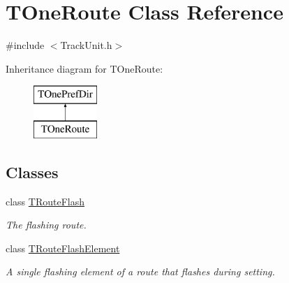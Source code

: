 \hypertarget{class_t_one_route}{}\section{T\+One\+Route Class Reference}
\label{class_t_one_route}


{\ttfamily \#include $<$Track\+Unit.\+h$>$}

Inheritance diagram for T\+One\+Route\+:\begin{figure}[H]
\begin{center}
\leavevmode
\includegraphics[height=2.000000cm]{class_t_one_route}
\end{center}
\end{figure}
\subsection*{Classes}
\begin{DoxyCompactItemize}
\item 
class \mbox{\hyperlink{class_t_one_route_1_1_t_route_flash}{T\+Route\+Flash}}
\begin{DoxyCompactList}\small\item\em The flashing route. \end{DoxyCompactList}\item 
class \mbox{\hyperlink{class_t_one_route_1_1_t_route_flash_element}{T\+Route\+Flash\+Element}}
\begin{DoxyCompactList}\small\item\em A single flashing element of a route that flashes during setting. \end{DoxyCompactList}\end{DoxyCompactItemize}
